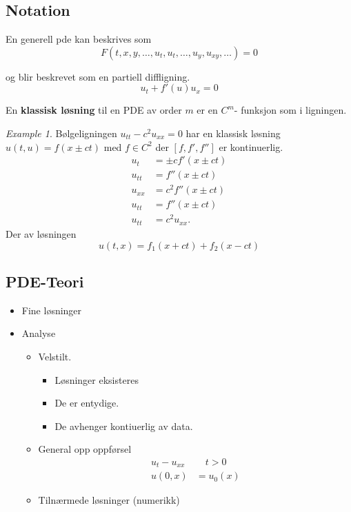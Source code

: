 \documentclass{article}
\theoremstyle{remark}
\newtheorem{example}{Example}
\begin{document}
 \subsection{Notation}%
 \label{sub:notation}

 En generell pde kan beskrives som \[
 F\left( t, x, y, \ldots, u_{t}, u_{t} , \ldots , u_{y} , u_{xy}, \ldots  \right) = 0
 \] 

 og blir beskrevet som en partiell diffligning. \[
 u_{t} + f'\left( u \right) u_{x} = 0
 \] 

 En \textbf{klassisk løsning }  til en PDE av order $m$ er en $C^{m}$- funksjon som i ligningen. 

 \begin{example}
   Bølgeligningen $u_{tt} - c^2 u_{x x} = 0$ har en klassisk løsning $u\left( t,u \right) = f\left( x \pm ct \right)$ med $f \in C^2 $  der $\left[ f, f', f''  \right]$ er kontinuerlig. 
   \begin{align*}
     u_{t} &=  \pm c f'\left( x \pm ct \right) \\
     u_{t t} &=  f''\left( x \pm ct \right) \\
     u_{x x} &=  c^2 f''\left( x \pm ct \right) \\
     u_{t t} &=  f'' \left( x \pm ct \right) \\
     u_{tt} &=  c^2 u_{x x}     
   .\end{align*}
   Der av løsningen \[
   u\left( t,x \right) = f_{1}\left( x + ct \right) + f_{2}\left( x -ct \right)
   \] 
 \end{example}


 \subsection{PDE-Teori}%
 \label{sub:pde_teori}
 
 \begin{itemize}
   \item  Fine løsninger
   \item Analyse  
     \begin{itemize}
       \item Velstilt.
         \begin{itemize}
           \item Løsninger eksisteres
           \item De er entydige.
           \item De avhenger kontiuerlig av data. 
         \end{itemize}
       \item General opp oppførsel
         \[
           \begin{split}
         u_{t} - u_{x x}  &  \quad  t > 0 \\
         u\left( 0,x \right) &= u_{0} \left( x \right)
           \end{split}
         \] 
       \item Tilnærmede løsninger (numerikk)
     \end{itemize}

 \end{itemize}
 
\end{document}
